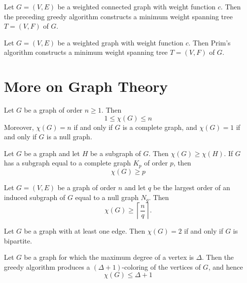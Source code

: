 \begin{theorem}
  \label{thm:11.7.5}
  Let $G = (V, E)$ be a weighted connected graph with weight function $c$. Then the preceding greedy
  algorithm constructs a minimum weight spanning tree $T = (V, F)$ of $G$.
\end{theorem}

\begin{theorem}
  \label{thm:11.7.6}
  Let $G = (V, E)$ be a weighted graph with weight function $c$. Then Prim's algorithm constructs a 
  minimum weight spanning tree $T = (V, F)$ of $G$.
\end{theorem}


\chapter{More on Graph Theory}

\begin{theorem}
  \label{thm:12.1.1}
  Let $G$ be a graph of order $n \geq 1$. Then
  $$
  1 \leq \chi(G) \leq n
  $$
  Moreover, $\chi(G)=n$ if and only if $G$ is a complete graph, and $\chi(G)=1$ if and only if $G$ 
  is a null graph.
\end{theorem}

\begin{corollary}
  \label{cor:12.1.2}
  Let $G$ be a graph and let $H$ be a subgraph of $G$. Then $\chi(G) \geq \chi(H)$. If $G$ has a 
  subgraph equal to a complete graph $K_p$ of order $p$, then
  $$
  \chi(G) \geq p
  $$
\end{corollary}

\begin{corollary}
  \label{cor:12.1.3}
  Let $G=(V, E)$ be a graph of order $n$ and let $q$ be the largest order of an induced subgraph of 
  $G$ equal to a null graph $N_q$. Then
  $$
  \chi(G) \geq\left\lceil\frac{n}{q}\right\rceil .
  $$
\end{corollary}

\begin{theorem}
  \label{thm:12.1.4}
  Let $G$ be a graph with at least one edge. Then $\chi(G) = 2$ if and only if $G$ is bipartite.
\end{theorem}

\begin{theorem}
  \label{thm:12.1.5}
  Let $G$ be a graph for which the maximum degree of a vertex is $\Delta$. Then the greedy algorithm
  produces a $(\Delta+1)$-coloring of the vertices of $G$, and hence
  $$
  \chi(G) \leq \Delta+1
  $$
\end{theorem}


